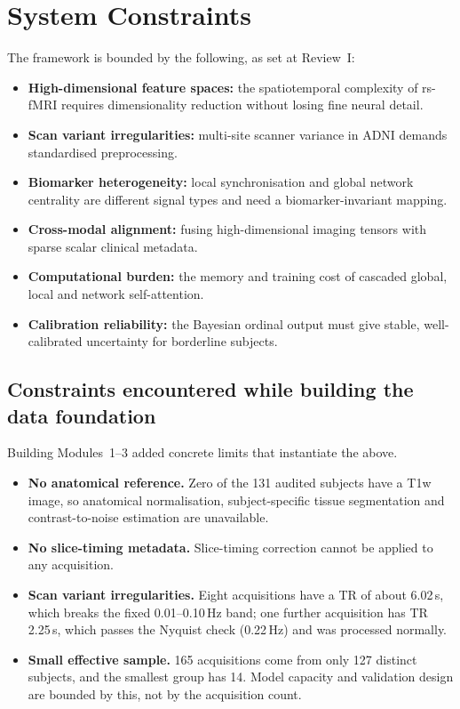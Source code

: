 \documentclass{ssnreview}
\begin{document}
\section{System Constraints}
The framework is bounded by the following, as set at Review~I:
\begin{itemize}[leftmargin=2em]
  \item \textbf{High-dimensional feature spaces:} the spatiotemporal complexity of
        rs-fMRI requires dimensionality reduction without losing fine neural detail.
  \item \textbf{Scan variant irregularities:} multi-site scanner variance in ADNI
        demands standardised preprocessing.
  \item \textbf{Biomarker heterogeneity:} local synchronisation and global network
        centrality are different signal types and need a biomarker-invariant mapping.
  \item \textbf{Cross-modal alignment:} fusing high-dimensional imaging tensors with
        sparse scalar clinical metadata.
  \item \textbf{Computational burden:} the memory and training cost of cascaded global,
        local and network self-attention.
  \item \textbf{Calibration reliability:} the Bayesian ordinal output must give
        stable, well-calibrated uncertainty for borderline subjects.
\end{itemize}

\subsection*{Constraints encountered while building the data foundation}
Building Modules~1--3 added concrete limits that instantiate the above.
\begin{itemize}[leftmargin=2em]
  \item \textbf{No anatomical reference.} Zero of the 131 audited subjects have a T1w
        image, so anatomical normalisation, subject-specific tissue segmentation and
        contrast-to-noise estimation are unavailable.
  \item \textbf{No slice-timing metadata.} Slice-timing correction cannot be applied to
        any acquisition.
  \item \textbf{Scan variant irregularities.} Eight acquisitions have a TR of about
        6.02\,s, which breaks the fixed 0.01--0.10\,Hz band; one further acquisition has
        TR 2.25\,s, which passes the Nyquist check (0.22\,Hz) and was processed normally.
  \item \textbf{Small effective sample.} 165 acquisitions come from only 127 distinct
        subjects, and the smallest group has 14. Model capacity and validation design
        are bounded by this, not by the acquisition count.
\end{itemize}
\end{document}
